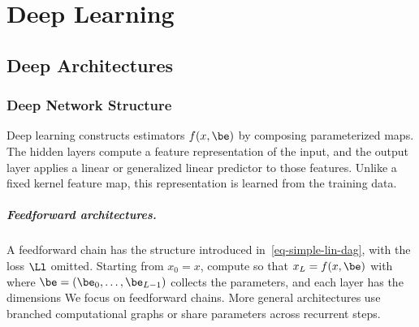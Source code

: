 
\chapter{Deep Learning}
\label{c-deep-learning}




\section{Deep Architectures}
\label{sec-deepnet-discr}

\subsection{Deep Network Structure}
\label{sec-deep-structure}

Deep learning constructs estimators $f(x,\be)$ by composing parameterized maps.
%
The hidden layers compute a feature representation of the input, and the output layer applies a linear or generalized linear predictor to those features. Unlike a fixed kernel feature map, this representation is learned from the training data.

\paragraph{Feedforward architectures.}

A feedforward chain has the structure introduced in~\eqref{eq-simple-lin-dag}, with the loss $\Ll$ omitted. Starting from $x_0=x$, compute
so that $x_L=f(x,\be)$ with 
where $\be=(\be_0,\ldots,\be_{L-1})$ collects the parameters, and each layer has the dimensions
%
We focus on feedforward chains. More general architectures use branched computational graphs or share parameters across recurrent steps.


